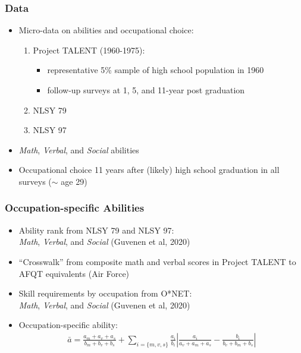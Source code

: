 \documentclass[11pt]{beamer}
\begin{document}
		\begin{frame}
			\frametitle{Data}
			\begin{itemize}
				\item Micro-data on abilities and occupational choice:
				\begin{enumerate}
					\item Project TALENT (1960-1975):
					\begin{itemize}
						\item representative 5\% sample of high school population in 1960
						\item follow-up surveys at 1, 5, and 11-year post graduation
					\end{itemize}
					\item NLSY 79
					\item NLSY 97
				\end{enumerate}
				\item \textit{Math}, \textit{Verbal}, and \textit{Social} abilities
				\item Occupational choice 11 years after (likely) high school graduation in all surveys ($\sim$ age 29)
			\end{itemize}
		\end{frame}
		
		\begin{frame}
			\frametitle{Occupation-specific Abilities}
			\begin{itemize}
				\item Ability rank from NLSY 79 and NLSY 97: \\
				\textit{Math}, \textit{Verbal}, and \textit{Social} (Guvenen et al, 2020)
				\item ``Crosswalk'' from composite math and verbal scores in Project TALENT to AFQT equivalents (Air Force)
				\item Skill requirements by occupation from O*NET: \\
				\textit{Math}, \textit{Verbal}, and \textit{Social} (Guvenen et al, 2020)
				\item Occupation-specific ability:
				\begin{align*}
					\bar{a}=\frac{a_m+a_v+a_s}{b_m+b_v+b_s}+\sum_{i=\{m,v,s\}}\frac{a_i}{b_i}\left|\frac{a_i}{a_v+a_m+a_s}-\frac{b_i}{b_v+b_m+b_s}\right|\nonumber
				\end{align*}  
			\end{itemize}
		\end{frame}
		
\end{document}

